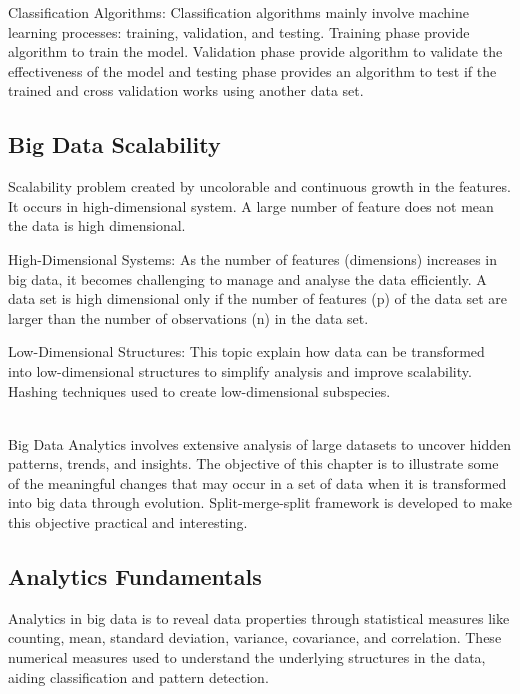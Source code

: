 \documentclass[conference,12pt]{IEEEtran}
\begin{document}
Classification Algorithms: Classification algorithms mainly involve machine learning processes: training, validation, and testing. Training phase provide algorithm to train the model. Validation phase provide algorithm to validate the effectiveness of the model and testing phase provides an algorithm to test if the trained and cross validation works using another data set.

\subsection{Big Data Scalability}
Scalability problem created by uncolorable and continuous growth in the features. It occurs in high-dimensional system. A large number of feature does not mean the data is high dimensional.

High-Dimensional Systems: As the number of features (dimensions) increases in big data, it becomes challenging to manage and analyse the data efficiently. A data set is high dimensional only if the number of features (p) of the data set are larger than the number of observations (n) in the data set.

Low-Dimensional Structures: This topic explain how data can be transformed into low-dimensional structures to simplify analysis and improve scalability. Hashing techniques used to create low-dimensional subspecies.
\newpage
{}
\setcounter{subsection}{0} 
\\Big Data Analytics involves extensive analysis of large datasets to uncover hidden patterns, trends, and insights. The objective of this chapter is to illustrate some of the meaningful changes that may occur in a set of data when it is transformed into big data through evolution. Split-merge-split framework is developed to make this objective practical and interesting.

\subsection{Analytics Fundamentals}
Analytics in big data is to reveal data properties through statistical measures like counting, mean, standard deviation, variance, covariance, and correlation. These numerical measures used to understand the underlying structures in the data, aiding classification and pattern detection.
\end{document}
